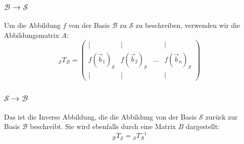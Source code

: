 \documentclass{article}
\begin{document}
\begin{minipage}[t]{0.45\textwidth}
    \subsubsection*{$\mathcal{B} \to \mathcal{S}$}
    Um die Abbildung \( f \) von der Basis \( \mathcal{B} \) zu \( \mathcal{S} \) zu beschreiben, verwenden wir die Abbildungsmatrix \( A \):
    \begin{equation*}
        {}_{\mathcal{S}}T_{\mathcal{B}} = \begin{pmatrix}
            | & | & & | \\
            f(\vec{b}_1)_{\mathcal{S}} & f(\vec{b}_2)_{\mathcal{S}} & \ldots & f(\vec{b}_n)_{\mathcal{S}} \\
            | & | & & |
        \end{pmatrix}
    \end{equation*}

    \subsubsection*{$\mathcal{S} \to \mathcal{B}$}
    Das ist die Inverse Abbildung, die die Abbildung von der Basis \( \mathcal{S} \) zurück zur Basis \( \mathcal{B} \) beschreibt. Sie wird ebenfalls durch eine Matrix \( B \) dargestellt:
    \begin{equation*}
        {}_{\mathcal{B}}T_{\mathcal{S}} = {}_{\mathcal{S}}T_{\mathcal{B}}^{-1}
    \end{equation*}

\end{minipage}
\hfill
\end{document}
